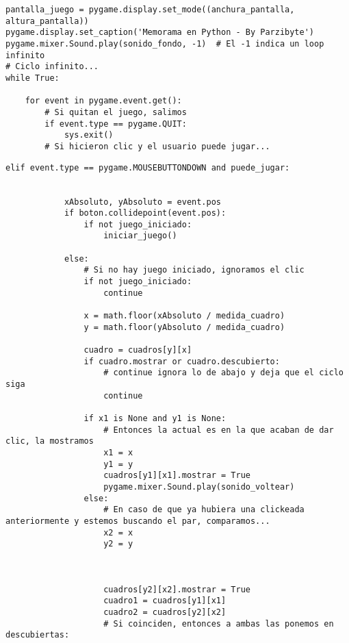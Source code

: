 \documentclass[10pt,twocolumn]{article}
\begin{document}
\lstset{language=Python, breaklines=true, basicstyle=\footnotesize}
\begin{lstlisting}[frame=single]
pantalla_juego = pygame.display.set_mode((anchura_pantalla, altura_pantalla))
pygame.display.set_caption('Memorama en Python - By Parzibyte')
pygame.mixer.Sound.play(sonido_fondo, -1)  # El -1 indica un loop infinito
# Ciclo infinito...
while True:
   
    for event in pygame.event.get():
        # Si quitan el juego, salimos
        if event.type == pygame.QUIT:
            sys.exit()
        # Si hicieron clic y el usuario puede jugar...
\end{lstlisting}
\lstset{language=Python, breaklines=true, basicstyle=\footnotesize}
\begin{lstlisting}[frame=single]
        elif event.type == pygame.MOUSEBUTTONDOWN and puede_jugar:

        
            xAbsoluto, yAbsoluto = event.pos
            if boton.collidepoint(event.pos):
                if not juego_iniciado:
                    iniciar_juego()

            else:
                # Si no hay juego iniciado, ignoramos el clic
                if not juego_iniciado:
                    continue
           
                x = math.floor(xAbsoluto / medida_cuadro)
                y = math.floor(yAbsoluto / medida_cuadro)
               
                cuadro = cuadros[y][x]
                if cuadro.mostrar or cuadro.descubierto:
                    # continue ignora lo de abajo y deja que el ciclo siga
                    continue
               
                if x1 is None and y1 is None:
                    # Entonces la actual es en la que acaban de dar clic, la mostramos
                    x1 = x
                    y1 = y
                    cuadros[y1][x1].mostrar = True
                    pygame.mixer.Sound.play(sonido_voltear)
                else:
                    # En caso de que ya hubiera una clickeada anteriormente y estemos buscando el par, comparamos...
                    x2 = x
                    y2 = y
                   
                   
                   
                    cuadros[y2][x2].mostrar = True
                    cuadro1 = cuadros[y1][x1]
                    cuadro2 = cuadros[y2][x2]
                    # Si coinciden, entonces a ambas las ponemos en descubiertas:
                    

\end{lstlisting}
\end{document}

